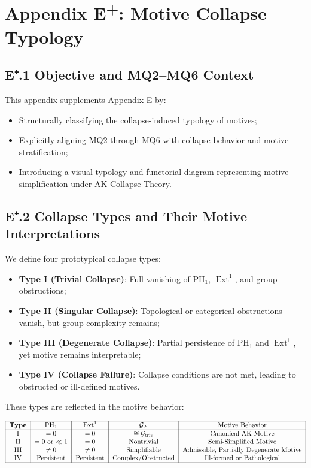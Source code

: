 \documentclass[11pt]{article}
\DeclareMathOperator{\Ext}{Ext}
\begin{document}
\section*{Appendix E\textsuperscript{+}: Motive Collapse Typology}

\subsection*{E⁺.1 Objective and MQ2–MQ6 Context}

This appendix supplements Appendix E by:

\begin{itemize}
    \item Structurally classifying the collapse-induced typology of motives;
    \item Explicitly aligning MQ2 through MQ6 with collapse behavior and motive stratification;
    \item Introducing a visual typology and functorial diagram representing motive simplification under AK Collapse Theory.
\end{itemize}

\subsection*{E⁺.2 Collapse Types and Their Motive Interpretations}

We define four prototypical collapse types:

\begin{itemize}
    \item \textbf{Type I (Trivial Collapse)}: Full vanishing of $\mathrm{PH}_1$, $\Ext^1$, and group obstructions;
    \item \textbf{Type II (Singular Collapse)}: Topological or categorical obstructions vanish, but group complexity remains;
    \item \textbf{Type III (Degenerate Collapse)}: Partial persistence of $\mathrm{PH}_1$ and $\Ext^1$, yet motive remains interpretable;
    \item \textbf{Type IV (Collapse Failure)}: Collapse conditions are not met, leading to obstructed or ill-defined motives.
\end{itemize}

These types are reflected in the motive behavior:

\[
\begin{tabular}{|c|c|c|c|c|}
\hline
\textbf{Type} & $\mathrm{PH}_1$ & $\Ext^1$ & $\mathcal{G}_{\mathcal{F}}$ & Motive Behavior \\
\hline
I & $=0$ & $=0$ & $\cong \mathcal{G}_{\mathrm{triv}}$ & Canonical AK Motive \\
II & $=0$ or $\ll 1$ & $=0$ & Nontrivial & Semi-Simplified Motive \\
III & $\neq 0$ & $\neq 0$ & Simplifiable & Admissible, Partially Degenerate Motive \\
IV & Persistent & Persistent & Complex/Obstructed & Ill-formed or Pathological \\
\hline
\end{tabular}
\]
\end{document}
